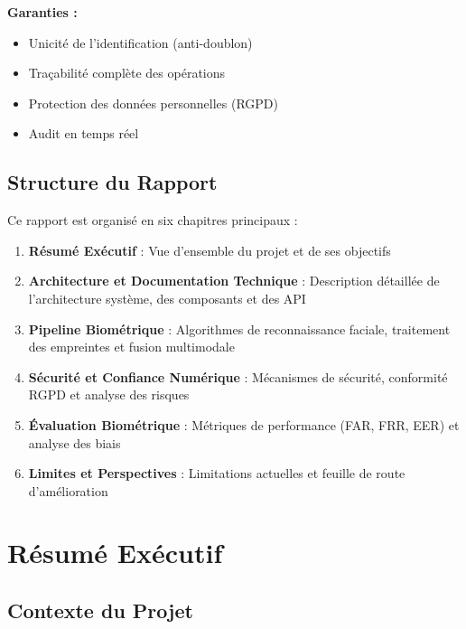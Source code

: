 \documentclass[12pt,a4paper]{report}
\begin{document}
\begin{tcolorbox}[colback=bioid-blue!5,colframe=bioid-blue,title=Cas d'Usage : Distribution d'Aide Humanitaire]
\textbf{Garanties :}
\begin{itemize}
    \item Unicité de l'identification (anti-doublon)
    \item Traçabilité complète des opérations
    \item Protection des données personnelles (RGPD)
    \item Audit en temps réel
\end{itemize}
\end{tcolorbox}

\section*{Structure du Rapport}

Ce rapport est organisé en six chapitres principaux :

\begin{enumerate}
    \item \textbf{Résumé Exécutif} : Vue d'ensemble du projet et de ses objectifs
    \item \textbf{Architecture et Documentation Technique} : Description détaillée de l'architecture système, des composants et des API
    \item \textbf{Pipeline Biométrique} : Algorithmes de reconnaissance faciale, traitement des empreintes et fusion multimodale
    \item \textbf{Sécurité et Confiance Numérique} : Mécanismes de sécurité, conformité RGPD et analyse des risques
    \item \textbf{Évaluation Biométrique} : Métriques de performance (FAR, FRR, EER) et analyse des biais
    \item \textbf{Limites et Perspectives} : Limitations actuelles et feuille de route d'amélioration
\end{enumerate}

\newpage

\chapter{Résumé Exécutif}

\section{Contexte du Projet}
\end{document}
